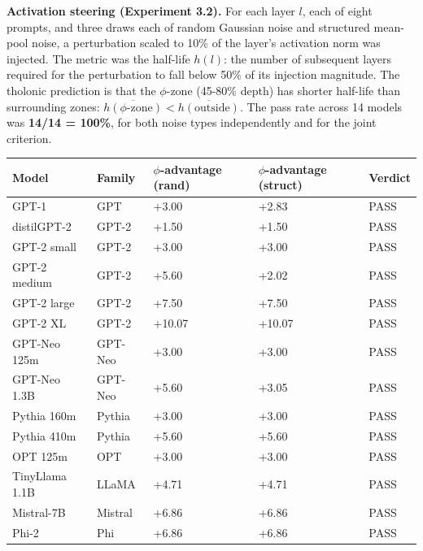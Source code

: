 \documentclass[
  11pt,
  letterpaper,
]{article}
\begin{document}
\textbf{Activation steering (Experiment 3.2).} For each layer \(l\),
each of eight prompts, and three draws each of random Gaussian noise and
structured mean-pool noise, a perturbation scaled to 10\% of the layer's
activation norm was injected. The metric was the half-life \(h(l)\): the
number of subsequent layers required for the perturbation to fall below
50\% of its injection magnitude. The tholonic prediction is that the
\(\phi\)-zone (45-80\% depth) has shorter half-life than surrounding
zones:
\(\overline{h(\phi\text{-zone})} < \overline{h(\text{outside})}\). The
pass rate across 14 models was \textbf{14/14 = 100\%}, for both noise
types independently and for the joint criterion.

\begin{longtable}[]{@{}
  >{\raggedright\arraybackslash}p{}
  >{\raggedright\arraybackslash}p{}
  >{\raggedright\arraybackslash}p{}
  >{\raggedright\arraybackslash}p{}
  >{\raggedright\arraybackslash}p{}@{}}
\toprule\noalign{}
\begin{minipage}[b]{\linewidth}\raggedright
Model
\end{minipage} & \begin{minipage}[b]{\linewidth}\raggedright
Family
\end{minipage} & \begin{minipage}[b]{\linewidth}\raggedright
\(\phi\)-advantage (rand)
\end{minipage} & \begin{minipage}[b]{\linewidth}\raggedright
\(\phi\)-advantage (struct)
\end{minipage} & \begin{minipage}[b]{\linewidth}\raggedright
Verdict
\end{minipage} \\
\midrule\noalign{}
\endhead
\bottomrule\noalign{}
\endlastfoot
GPT-1 & GPT & +3.00 & +2.83 & PASS \\
distilGPT-2 & GPT-2 & +1.50 & +1.50 & PASS \\
GPT-2 small & GPT-2 & +3.00 & +3.00 & PASS \\
GPT-2 medium & GPT-2 & +5.60 & +2.02 & PASS \\
GPT-2 large & GPT-2 & +7.50 & +7.50 & PASS \\
GPT-2 XL & GPT-2 & +10.07 & +10.07 & PASS \\
GPT-Neo 125m & GPT-Neo & +3.00 & +3.00 & PASS \\
GPT-Neo 1.3B & GPT-Neo & +5.60 & +3.05 & PASS \\
Pythia 160m & Pythia & +3.00 & +3.00 & PASS \\
Pythia 410m & Pythia & +5.60 & +5.60 & PASS \\
OPT 125m & OPT & +3.00 & +3.00 & PASS \\
TinyLlama 1.1B & LLaMA & +4.71 & +4.71 & PASS \\
Mistral-7B & Mistral & +6.86 & +6.86 & PASS \\
Phi-2 & Phi & +6.86 & +6.86 & PASS \\
\end{longtable}
\end{document}
